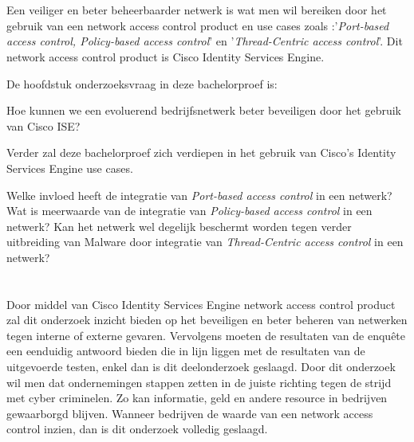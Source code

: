 \section{}
\label{sec:onderzoeksvraag}
Een veiliger en beter beheerbaarder netwerk is wat men wil bereiken door het gebruik van een network access control product en use cases zoals :'\textit{Port-based access control, Policy-based access control}' en '\textit{Thread-Centric access control}'. Dit network access control product is Cisco Identity Services Engine.

De hoofdstuk onderzoeksvraag in deze bachelorproef is: 
\begin{displayquote}
	Hoe kunnen we een evoluerend bedrijfsnetwerk beter beveiligen door het gebruik van Cisco ISE?
\newline
\newline
\end{displayquote}
Verder zal deze bachelorproef zich verdiepen in het gebruik van Cisco's Identity Services Engine use cases. 
\begin{displayquote}
	Welke invloed heeft de integratie van \textit{Port-based access control} in een netwerk?  
\newline
\newline
	Wat is meerwaarde van de integratie van \textit{Policy-based access control} in een netwerk?  
\newline
\newline
	Kan het netwerk wel degelijk beschermt worden tegen verder uitbreiding van Malware door integratie van \textit{Thread-Centric access control} in een netwerk?  
\end{displayquote}

\section{}
\label{sec:onderzoeksdoelstelling}

Door middel van Cisco Identity Services Engine network access control product zal dit onderzoek inzicht bieden op het beveiligen en beter beheren van netwerken tegen interne of externe gevaren. Vervolgens moeten de resultaten van de enquête een eenduidig antwoord bieden die in lijn liggen met de resultaten van de uitgevoerde testen, enkel dan is dit deelonderzoek geslaagd. Door dit onderzoek wil men dat ondernemingen stappen zetten in de juiste richting tegen de strijd met cyber criminelen. Zo kan informatie, geld en andere resource in bedrijven gewaarborgd blijven. Wanneer bedrijven de waarde van een network access control inzien, dan is dit onderzoek volledig geslaagd.

